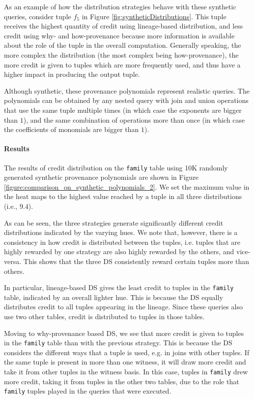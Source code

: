 As an example of how the distribution strategies behave with these synthetic queries, consider tuple $f_5$ in Figure \ref{fig:syntheticDistributions}.
This tuple receives the highest quantity of credit using lineage-based distribution, and less credit using why- and how-provenance because more information is available about the role of the tuple in the overall computation. 
Generally speaking, the more complex the distribution (the most complex being how-provenance), the more credit is given to tuples which are more frequently used, and thus have a higher impact in producing the output tuple. 

Although synthetic, these provenance polynomials represent realistic queries.  The polynomials can be obtained by any nested query with join and union operations that use the same tuple multiple times (in which case the exponents are bigger than $1$), and the same combination of operations more than once (in which case the coefficients of monomials are bigger than $1$). 

\paragraph{Results} The results of credit distribution on the \texttt{family} table using 10K randomly generated synthetic provenance polynomials are shown in
Figure \ref{figure:comparison_on_synthetic_polynomials_2}. 
We set the maximum value in the heat maps to the highest value reached by a tuple in all three distributions (i.e., $9.4$). 

As can be seen, the three strategies generate significantly different credit distributions indicated by the varying hues. 
We note that, however, there is a consistency in how credit is distributed between the tuples, i.e. tuples that are highly rewarded by one strategy are also highly rewarded by the others, and vice-versa. This shows that the three DS consistently reward certain tuples more than others. 

In particular, lineage-based DS gives the least credit to tuples in the \texttt{family} table, indicated by an overall lighter hue. This is because the DS equally distributes credit to all tuples appearing in the lineage. Since these queries also use two other tables, credit is distributed to tuples in those tables.

Moving to why-provenance based DS, we see that more credit is given to tuples in the \texttt{family} table than with the previous strategy. This is because the DS considers the different ways that a tuple is used, e.g. in joins with other tuples. If the same tuple is present in more than one witness, it will draw more credit and take it from  other tuples in the witness basis. In this case, tuples in \texttt{family} drew more credit, taking it from tuples in the other two tables, due to the role that \texttt{family}  tuples played in the queries that were executed.

